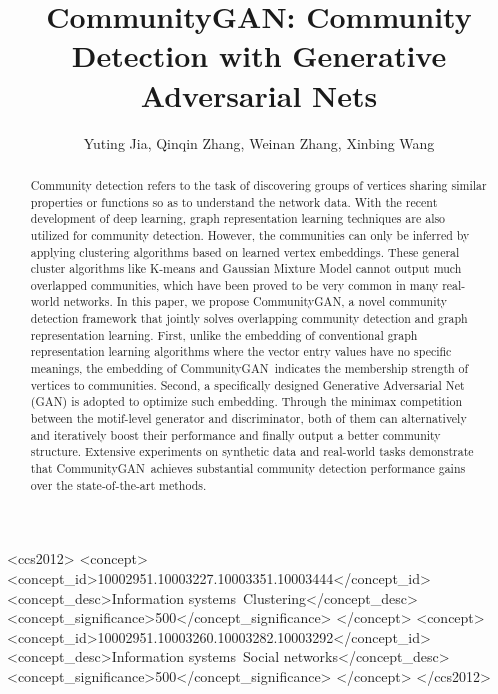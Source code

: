 \documentclass[sigconf]{acmart}
\newcommand{\ComGAN}{CommunityGAN}
\begin{document}
\title{\ComGAN: Community Detection with Generative Adversarial Nets}


\author{Yuting Jia, Qinqin Zhang, Weinan Zhang, Xinbing Wang}


\renewcommand{\shortauthors}{Y. Jia et al.}


\begin{abstract}
Community detection refers to the task of discovering groups of vertices sharing similar properties or functions so as to understand the network data.
With the recent development of deep learning, graph representation learning techniques are also utilized for community detection.
However, the communities can only be inferred by applying clustering algorithms based on learned vertex embeddings.
These general cluster algorithms like K-means and Gaussian Mixture Model cannot output much overlapped communities, which have been proved to be very common in many real-world networks.
In this paper, we propose \ComGAN, a novel community detection framework that jointly solves overlapping community detection and graph representation learning.
First, unlike the embedding of conventional graph representation learning algorithms where the vector entry values have no specific meanings, the embedding of \ComGAN~indicates the membership strength of vertices to communities.
Second, a specifically designed Generative Adversarial Net (GAN) is adopted to optimize such embedding.
Through the minimax competition between the motif-level generator and discriminator, both of them can alternatively and iteratively boost their performance and finally output a better community structure.
Extensive experiments on synthetic data and real-world tasks demonstrate that \ComGAN~achieves substantial community detection performance gains over the state-of-the-art methods.
\end{abstract}

\begin{CCSXML}
<ccs2012>
  <concept>
    <concept_id>10002951.10003227.10003351.10003444</concept_id>
    <concept_desc>Information systems~Clustering</concept_desc>
    <concept_significance>500</concept_significance>
  </concept>
  <concept>
    <concept_id>10002951.10003260.10003282.10003292</concept_id>
    <concept_desc>Information systems~Social networks</concept_desc>
    <concept_significance>500</concept_significance>
  </concept>
</ccs2012>
\end{CCSXML}
\end{document}
